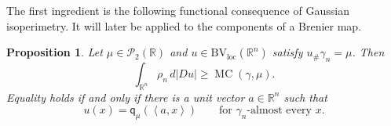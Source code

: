 \documentclass[11pt]{amsart}
\newtheorem{proposition}[proposition]{Proposition}
\theoremstyle{definition}
\newcommand{\R}{\mathbb{R}}
\newcommand{\Pcal}{\mathcal{P}}
\newcommand{\ip}[2]{\left\langle #1,#2\right\rangle}
\newcommand{\qmu}{\mathsf q_{\mu}}
\newcommand{\MC}{\operatorname{MC}}
\newcommand{\BVloc}{\operatorname{BV_{loc}}}
\begin{document}
The first ingredient is the following functional consequence of
Gaussian isoperimetry. It will later be applied to the components of
a Brenier map.

\begin{proposition}\label{prop:ineq_component}
Let $\mu \in \Pcal_2(\R)$ and $u\in \BVloc(\R^n)$ satisfy
$u_\#\gamma_n=\mu$. Then
\begin{equation}\label{eq:scalar-bound}
  \int_{\R^n} \rho_n \,  d|Du| \ge \MC(\gamma,\mu).
\end{equation}
Equality holds if and only if there is a
unit vector $a\in\R^n$ such that
\begin{equation}\label{eq:scalar-equality}
  u(x)=\qmu(\ip{a}{x})
  \qquad\text{for $\gamma_n$-almost every $x$.}
\end{equation}
\end{proposition}
\end{document}

